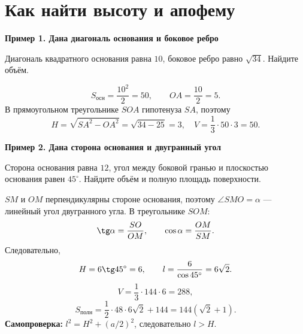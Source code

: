 \documentclass[a4paper,12pt]{article}
\newcommand{\sub}[1]{\par\medskip\textcolor{darkaccent}{\textbf{#1}}\par\smallskip}
\newcommand{\Sos}{S_{\text{осн}}}
\newcommand{\Sp}{S_{\text{полн}}}
\begin{document}
\section{Как найти высоту и апофему}
\sub{Пример 1. Дана диагональ основания и боковое ребро}
Диагональ квадратного основания равна $10$, боковое ребро равно $\sqrt{34}$. Найдите объём.
\begin{center}
\end{center}
\[
\Sos=\frac{10^2}{2}=50,\qquad OA=\frac{10}{2}=5.
\]
В прямоугольном треугольнике $SOA$ гипотенуза $SA$, поэтому
\[
H=\sqrt{SA^2-OA^2}=\sqrt{34-25}=3,\quad V=\frac13\cdot50\cdot3=50.
\]
\sub{Пример 2. Дана сторона основания и двугранный угол}
Сторона основания равна $12$, угол между боковой гранью и плоскостью основания равен $45^\circ$. Найдите объём и полную площадь поверхности.

$SM$ и $OM$ перпендикулярны стороне основания, поэтому $\angle SMO=\alpha$ --- линейный угол двугранного угла. В треугольнике $SOM$:
\[
\tg\alpha=\frac{SO}{OM},\qquad \cos\alpha=\frac{OM}{SM}.
\]
Следовательно,
\[
H=6\tg45^\circ=6,\qquad l=\frac{6}{\cos45^\circ}=6\sqrt2.
\]
\[
V=\frac13\cdot144\cdot6=288,
\]
\[
\Sp=\frac12\cdot48\cdot6\sqrt2+144=144(\sqrt2+1).
\]
\textbf{Самопроверка:} $l^2=H^2+(a/2)^2$, следовательно $l>H$.
\clearpage
\end{document}
